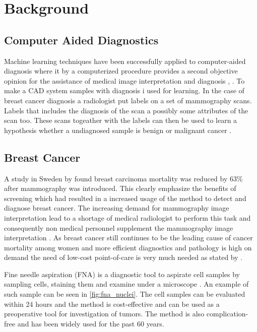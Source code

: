 \chapter{Background}


\section{Computer Aided Diagnostics}

Machine learning techniques have been successfully applied to computer-aided diagnosis where it by a computerized procedure provides a second objective opinion for the assistance of medical image interpretation and diagnosis \parencite{li2007}, \parencite{ni2016}. To make a CAD system samples with diagnosis i used for learning. In the case of breast cancer diagnosis a radiologist put labels on a set of mammography scans. Labels that includes the diagnosis of the scan a possibly some attributes of the scan too. These scans togeather with the labels can then be used to learn a hypothesis whether a undiagnosed sample is benign or malignant cancer \parencite{li2007}.


\section{Breast Cancer}

A study in Sweden by \textcite{tabar2001} found breast carcinoma mortality was reduced by 63\% after mammography was introduced. This clearly emphasize the benefits of screening which had resulted in a increased usage of the method to detect and diagnose breast cancer. The increasing demand for mammography image interpretation lead to a shortage of medical radiologist to perform this task and consequently non medical personnel supplement the mammography image interpretation \parencite{culpan2016}. As breast cancer still continues to be the leading cause of cancer mortality among women and more efficient diagnostics and pathology is high on demand the need of low-cost point-of-care is very much needed as stated by \textcite{martei2018}.

Fine needle aspiration (FNA) is a diagnostic tool to aspirate cell samples by sampling cells, staining them and examine under a microscope \parencite{FNA}. An example of such sample can be seen in \ref{fig:fna_nuclei}. The cell samples can be evaluated within 24 hours and the method is cost-effective and can be used as a preoperative tool for investigation of tumors. The method is also complication-free and has been widely used for the past 60 years.

